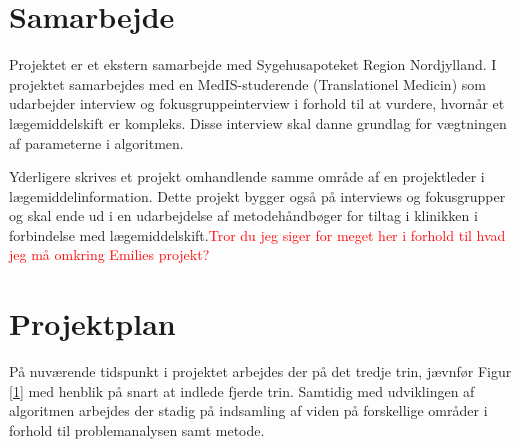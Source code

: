 \section{Samarbejde}
Projektet er et ekstern samarbejde med Sygehusapoteket Region Nordjylland. I projektet samarbejdes med en MedIS-studerende (Translationel Medicin) som udarbejder interview og fokusgruppeinterview i forhold til at vurdere, hvornår et lægemiddelskift er kompleks. Disse interview skal danne grundlag for vægtningen af parameterne i algoritmen. 

Yderligere skrives et projekt omhandlende samme område af en projektleder i lægemiddelinformation. Dette projekt bygger også på interviews og fokusgrupper og skal ende ud i en udarbejdelse af metodehåndbøger for tiltag i klinikken i forbindelse med lægemiddelskift.\textcolor{red}{Tror du jeg siger for meget her i forhold til hvad jeg må omkring Emilies projekt?}

\section{Projektplan}
På nuværende tidspunkt i projektet arbejdes der på det tredje trin, jævnfør Figur \ref{1} med henblik på snart at indlede fjerde trin. Samtidig med udviklingen af algoritmen arbejdes der stadig på indsamling af viden på forskellige områder i forhold til problemanalysen samt metode.



